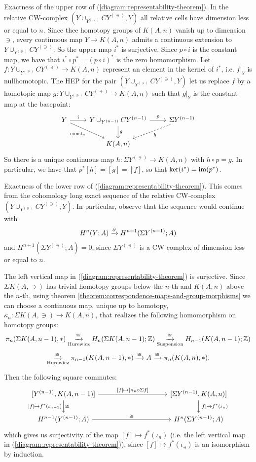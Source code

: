 Exactness of the upper row of (\ref{diagram:representability-theorem}). In the relative CW-complex $(Y\cup_{Y^{(\ni)}}CY^{(\ni)},Y)$ all relative cells have dimension less or equal to $n$. Since thee homotopy groups of $K(A,n)$ vanish up to dimension $\ni$, every continuous map $Y\to K(A,n)$ admits a continuous extension to $Y\cup_{Y^{(\ni)}}CY^{(\ni)}$. So the upper map $i^*$ is surjective. Since $p\circ i$ is the constant map, we have that $i^*\circ p^*=(p\circ i)^*$ is the zero homomorphism. Let $f:Y\cup_{Y^{(\ni)}}CY^{(\ni)}\to K(A,n)$ represent an element in the kernel of $i^*$, i.e. $f|_Y$ is nullhomotopic. The HEP for the pair $(Y\cup_{Y^{(\ni)}}CY^{(\ni)},Y)$ let us replace $f$ by a homotopic map $g:Y\cup_{Y^{(\ni)}}CY^{(\ni)}\to K(A,n)$ such that $g|_Y$ is the constant map at the basepoint:
\[
\begin{tikzcd}
Y \ar[dr,"\const_*"'] \ar[r,"i"] & Y\cup_{Y^{(\ni)}}CY^{(\ni)} \ar[d,"g"] \ar[r,"p"] & \Sigma Y^{(\ni)} \ar[dl,dashed,"h"]\\
& K(A,n) &
\end{tikzcd}
\]
So there is a unique continuous map $h:\Sigma Y^{(\ni)}\to K(A,n)$ with $h\circ p=g$. In particular, we have that $p^*[h]=[g]=[f]$, so that $\ker(i^*)=\operatorname{im}(p^*)$.

Exactness of the lower row of (\ref{diagram:representability-theorem}). This comes from the cohomology long exact sequence of the relative CW-complex $(Y\cup_{Y^{(\ni)}}CY^{(\ni)},Y)$. In particular, observe that the sequence would continue with
\[H^n(Y;A)\xrightarrow{\partial} H^{n+1}(\Sigma Y^{({n-1})};A)\]
and $H^{n+1}(\Sigma Y^{(\ni)};A)=0$, since $\Sigma Y^{(\ni)}$ is a CW-complex of dimension less or equal to $n$.

The left vertical map in (\ref{diagram:representability-theorem}) is surjective. Since $\Sigma K(A,\ni)$ has trivial homotopy groups below the $n$-th and $K(A,n)$ above the $n$-th, using theorem \ref{theorem:correspondence-maps-and-group-morphisms} we can choose a continuous map, unique up to homotopy, $\kappa_n:\Sigma K(A,\ni)\to K(A,n)$, that realizes the following homomorphism on homotopy groups:
\[
    \pi_n(\Sigma K(A,{n-1}),*)\underset{\text{Hurewicz}}{\xrightarrow{\cong}}H_n(\Sigma K(A,{n-1});{\mathbb Z})\underset{\text{Suspension}}{\xrightarrow{\cong}} H_{n-1}(K(A,{n-1});{\mathbb Z})
\]
\[
    \underset{\text{Hurewicz}}{\xrightarrow{\cong}}\pi_{n-1}(K(A,{n-1}),*)\xrightarrow{\cong}A\xrightarrow{\cong}\pi_n(K(A,n),*).
\]

Then the following square commutes:
\[
\begin{tikzcd}[column sep=10em]
{[Y^{(\ni)},K(A,\ni)]} \ar[d,"\cong","{[f]}\mapsto f^*(\iota_\ni)"'] \ar[r,"{[f]}\mapsto{[\kappa_n\circ\Sigma f]}"] & {[\Sigma Y^{(\ni)},K(A,n)]} \ar[d,"{[f]}\mapsto f^*(\iota_n)"]\\
H^\ni(Y^{(\ni)};A) \ar[r,"\cong"] & H^n(\Sigma Y^{(\ni)};A)
\end{tikzcd}
\]
which gives us surjectivity of the map ${[f]}\mapsto f^*(\iota_n)$ (i.e. the left vertical map in (\ref{diagram:representability-theorem})), since ${[f]}\mapsto f^*(\iota_\ni)$ is an isomorphism by induction.

